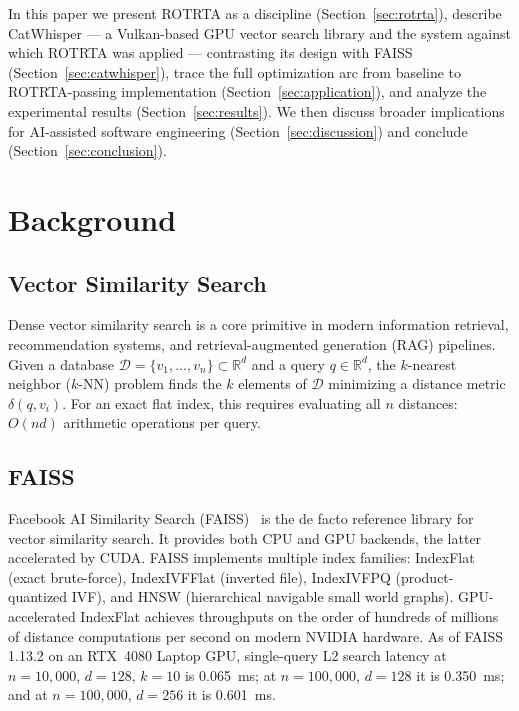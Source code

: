\documentclass[conference]{IEEEtran}
\begin{document}
In this paper we present ROTRTA as a discipline (Section~\ref{sec:rotrta}),
describe CatWhisper --- a Vulkan-based GPU vector search library and the
system against which ROTRTA was applied --- contrasting its design with
FAISS (Section~\ref{sec:catwhisper}), trace the full optimization arc from
baseline to ROTRTA-passing implementation (Section~\ref{sec:application}),
and analyze the experimental results (Section~\ref{sec:results}).  We then
discuss broader implications for AI-assisted software engineering
(Section~\ref{sec:discussion}) and conclude (Section~\ref{sec:conclusion}).

\section{Background}
\label{sec:background}

\subsection{Vector Similarity Search}

Dense vector similarity search is a core primitive in modern information
retrieval, recommendation systems, and retrieval-augmented generation
(RAG) pipelines.  Given a database $\mathcal{D} = \{v_1, \ldots, v_n\}
\subset \mathbb{R}^d$ and a query $q \in \mathbb{R}^d$, the $k$-nearest
neighbor ($k$-NN) problem finds the $k$ elements of $\mathcal{D}$ minimizing
a distance metric $\delta(q, v_i)$.  For an exact flat index, this requires
evaluating all $n$ distances: $O(nd)$ arithmetic operations per query.

\subsection{FAISS}

Facebook AI Similarity Search (FAISS)~\cite{johnson2019billion} is the
de facto reference library for vector similarity search.  It provides both
CPU and GPU backends, the latter accelerated by CUDA.  FAISS implements
multiple index families: IndexFlat (exact brute-force), IndexIVFFlat
(inverted file), IndexIVFPQ (product-quantized IVF), and HNSW
(hierarchical navigable small world graphs).  GPU-accelerated IndexFlat
achieves throughputs on the order of hundreds of millions of distance
computations per second on modern NVIDIA hardware.  As of FAISS 1.13.2
on an RTX~4080 Laptop GPU, single-query L2 search latency at $n=10{,}000$,
$d=128$, $k=10$ is \SI{0.065}{\ms}; at $n=100{,}000$, $d=128$ it is
\SI{0.350}{\ms}; and at $n=100{,}000$, $d=256$ it is \SI{0.601}{\ms}.
\end{document}
